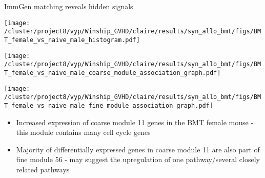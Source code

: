 \documentclass[final,hyperref={pdfpagelabels=false}]{beamer}
\begin{document}
\begin{frame}{}
\begin{columns}[t]
\begin{column}{.36\linewidth}
\begin{block}{ImmGen matching reveals hidden signals}
	  
          \begin{minipage}{0.30\textwidth}
            \texttt{[image: /cluster/project8/vyp/Winship\_GVHD/claire/results/syn\_allo\_bmt/figs/BMT\_female\_vs\_naive\_male\_histogram.pdf]}
          \end{minipage}
	  \hfill 
	\begin{minipage}{0.30\textwidth}
            \texttt{[image: /cluster/project8/vyp/Winship\_GVHD/claire/results/syn\_allo\_bmt/figs/BMT\_female\_vs\_naive\_male\_coarse\_module\_association\_graph.pdf]}
          \end{minipage}
	\hfill
	\begin{minipage}{0.30\textwidth}
            \texttt{[image: /cluster/project8/vyp/Winship\_GVHD/claire/results/syn\_allo\_bmt/figs/BMT\_female\_vs\_naive\_male\_fine\_module\_association\_graph.pdf]}
          \end{minipage}
	{\small \begin{itemize}
	\item Increased expression of coarse module 11 genes in the BMT female mouse - this module contains many cell cycle genes
	\item Majority of differentially expressed genes in coarse module 11 are also part of fine module 56 - may suggest the upregulation of one pathway/several closely related pathways 
	\end{itemize}}







\end{block}
\end{column}
\end{columns}
\end{frame}
\end{document}
